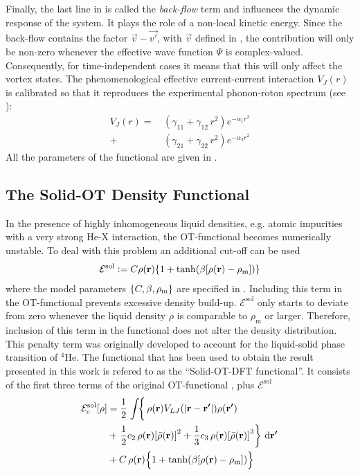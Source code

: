 		Finally, the last line in  is called the \emph{back-flow} term and influences the dynamic response of the system. It plays the role of a non-local kinetic energy. Since the back-flow contains the factor $\vec{v}-\vec{v'}$, with $\vec{v}$ defined in , the contribution will only be non-zero whenever the effective wave function $\Psi$ is complex-valued. Consequently, for time-independent cases it means that this will only affect the vortex states. The phenomenological effective current-current interaction $V_J(r)$ is calibrated so that it reproduces the experimental phonon-roton spectrum (see ):
		\begin{align}
			V_J(r) =\,&(\gamma_{11} +\gamma_{12} \, r^2) e^{-\alpha_1 r^2} \nonumber \\
				+\,&(\gamma_{21} +\gamma_{22} \, r^2) e^{-\alpha_2 r^2}
		\end{align}
		All the parameters of the functional are given in .

		\subsection{The Solid-OT Density Functional}\label{sec:solid}
			In the presence of highly inhomogeneous liquid densities, e.g. atomic impurities with a very strong He-X interaction, the OT-functional  becomes numerically unstable. To deal with this problem an additional cut-off can be used
			\begin{align}
				\mathcal{E}^\mathrm{sol} \vcentcolon= C\rho(\bm{\mathrm{r}})\qty{1+\tanh(\beta\qty[\rho(\bm{\mathrm{r}})-\rho_\mathrm{m}])}
			\end{align}
			where the model parameters $\qty{C,\beta,\rho_\mathrm{m}}$ are specified in . Including this term in the OT-functional prevents excessive density build-up. $\mathcal{E}^\mathrm{sol}$ only starts to deviate from zero whenever the liquid density $\rho$ is comparable to $\rho_\mathrm{m}$ or larger. Therefore, inclusion of this term in the functional does not alter the density distribution. This penalty term was originally developed to account for the liquid-solid phase transition of $^4$He\citep{Anc05a,Cau07}. The functional that has been used to obtain the result presented in this work is refered to as the ``Solid-OT-DFT functional''. It consists of the first three terms of the original OT-functional , plus $\mathcal{E}^\mathrm{sol}$
			\begin{align}
				\mathcal{E}_c^\mathrm{sol}[\rho] &=  
				\frac{1}{2} \left.\int \! \right\{\rho(\bm{\mathrm{r}}) V_{LJ}(\abs{\bm{\mathrm{r}}-\bm{\mathrm{r'}}}) \rho(\bm{\mathrm{r'}}) \nonumber \\
				&+ \left.\frac{1}{2} c_2\, \rho(\bm{\mathrm{r}}) \qty[\bar\rho(\bm{\mathrm{r}})]^2 
				+ \frac{1}{3} c_3 \, \rho(\bm{\mathrm{r}}) \qty[\bar\rho(\bm{\mathrm{r}})]^3\right\}\,\mathrm{d}{\bm{\mathrm{r'}}} \nonumber \\
				&+ C\,\rho(\bm{\mathrm{r}})\qty\Big{1+\tanh(\beta\qty[\rho(\bm{\mathrm{r}})-\rho_\mathrm{m}])} \label{eq:solid-otf}
			\end{align}

